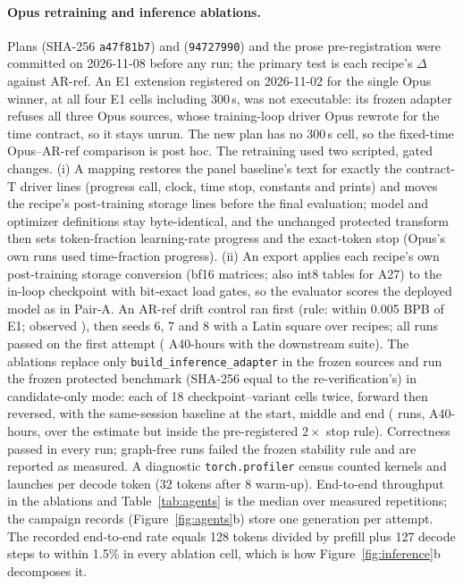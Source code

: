 \documentclass{article}
\begin{document}
\paragraph{Opus retraining and inference ablations.} Plans  (SHA-256 \texttt{a47f81b7}) and  (\texttt{94727990}) and the prose pre-registration  were committed on 2026-11-08 before any run; the primary test is each recipe's $\Delta$ against AR-ref. An E1 extension registered on 2026-11-02 for the single Opus winner, at all four E1 cells including 300\,s, was not executable: its frozen adapter refuses all three Opus sources, whose training-loop driver Opus rewrote for the time contract, so it stays unrun. The new plan has no 300\,s cell, so the fixed-time Opus--AR-ref comparison is post hoc. The retraining used two scripted, gated changes. (i) A mapping restores the panel baseline's text for exactly the contract-T driver lines (progress call, clock, time stop, constants and prints) and moves the recipe's post-training storage lines before the final evaluation; model and optimizer definitions stay byte-identical, and the unchanged protected transform then sets token-fraction learning-rate progress and the exact-token stop (Opus's own runs used time-fraction progress). (ii) An export applies each recipe's own post-training storage conversion (bf16 matrices; also int8 tables for A27) to the in-loop checkpoint with bit-exact load gates, so the evaluator scores the deployed model as in Pair-A. An AR-ref drift control ran first (rule: within 0.005 BPB of E1; observed \CRMTDriftAbs), then seeds 6, 7 and 8 with a Latin square over recipes; all \CRMTRuns{} runs passed on the first attempt (\CRMTHours{} A40-hours with the downstream suite). The ablations replace only \texttt{build\_inference\_adapter} in the frozen sources and run the frozen protected benchmark (SHA-256 equal to the re-verification's) in candidate-only mode: each of 18 checkpoint--variant cells twice, forward then reversed, with the same-session baseline at the start, middle and end (\CRIARuns{} runs, \CRIAHours{} A40-hours, over the estimate but inside the pre-registered $2\times$ stop rule). Correctness passed in every run; \CRIAUnstable{} graph-free runs failed the frozen stability rule and are reported as measured. A diagnostic \texttt{torch.profiler} census counted kernels and launches per decode token (32 tokens after 8 warm-up). End-to-end throughput in the ablations and Table~\ref{tab:agents} is the median over measured repetitions; the campaign records (Figure~\ref{fig:agents}b) store one generation per attempt. The recorded end-to-end rate equals 128 tokens divided by prefill plus 127 decode steps to within 1.5\% in every ablation cell, which is how Figure~\ref{fig:inference}b decomposes it.
\end{document}
